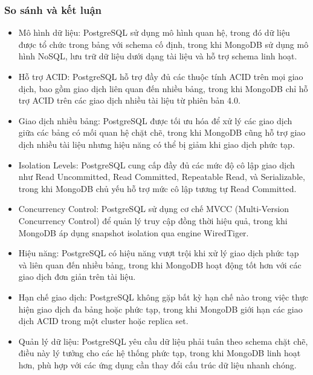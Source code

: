 \subsubsection{So sánh và kết luận}
\begin{itemize}
    \item Mô hình dữ liệu: PostgreSQL sử dụng mô hình quan hệ, trong đó dữ liệu được tổ chức trong bảng với schema cố định, trong khi MongoDB sử dụng mô hình NoSQL, lưu trữ dữ liệu dưới dạng tài liệu và hỗ trợ schema linh hoạt.
    \item Hỗ trợ ACID: PostgreSQL hỗ trợ đầy đủ các thuộc tính ACID trên mọi giao dịch, bao gồm giao dịch liên quan đến nhiều bảng, trong khi MongoDB chỉ hỗ trợ ACID trên các giao dịch nhiều tài liệu từ phiên bản 4.0.
    \item Giao dịch nhiều bảng: PostgreSQL được tối ưu hóa để xử lý các giao dịch giữa các bảng có mối quan hệ chặt chẽ, trong khi MongoDB cũng hỗ trợ giao dịch nhiều tài liệu nhưng hiệu năng có thể bị giảm khi giao dịch phức tạp.
    \item Isolation Levels: PostgreSQL cung cấp đầy đủ các mức độ cô lập giao dịch như Read Uncommitted, Read Committed, Repeatable Read, và Serializable, trong khi MongoDB chủ yếu hỗ trợ mức cô lập tương tự Read Committed.
    \item Concurrency Control: PostgreSQL sử dụng cơ chế MVCC (Multi-Version Concurrency Control) để quản lý truy cập đồng thời hiệu quả, trong khi MongoDB áp dụng snapshot isolation qua engine WiredTiger.
    \item Hiệu năng: PostgreSQL có hiệu năng vượt trội khi xử lý giao dịch phức tạp và liên quan đến nhiều bảng, trong khi MongoDB hoạt động tốt hơn với các giao dịch đơn giản trên tài liệu.
    \item Hạn chế giao dịch: PostgreSQL không gặp bất kỳ hạn chế nào trong việc thực hiện giao dịch đa bảng hoặc phức tạp, trong khi MongoDB giới hạn các giao dịch ACID trong một cluster hoặc replica set.
    \item Quản lý dữ liệu: PostgreSQL yêu cầu dữ liệu phải tuân theo schema chặt chẽ, điều này lý tưởng cho các hệ thống phức tạp, trong khi MongoDB linh hoạt hơn, phù hợp với các ứng dụng cần thay đổi cấu trúc dữ liệu nhanh chóng.
\end{itemize}
